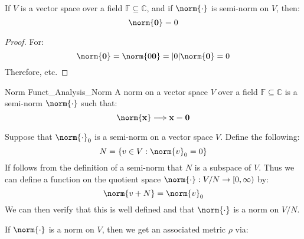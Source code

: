 \documentclass[crop=false,class=book,oneside]{standalone}                      %
\begin{document}
            \begin{theorem}
                If $V$ is a vector space over a field
                $\mathbb{F}\subseteq\mathbb{C}$, and if
                $\norm{\cdot}$ is semi-norm on $V$, then:
                \begin{equation}
                    \norm{\mathbf{0}}=0
                \end{equation}
            \end{theorem}
            \begin{proof}
                For:
                \begin{equation}
                    \norm{\mathbf{0}}
                    =\norm{0\mathbf{0}}
                    =|0|\norm{\mathbf{0}}=0
                \end{equation}
                Therefore, etc.
            \end{proof}
            \begin{ldefinition}{Norm}
                  {Funct_Analysis_Norm}
                A norm on a vector space $V$ over a
                field $\mathbb{F}\subseteq\mathbb{C}$
                is a semi-norm $\norm{\cdot}$ such that:
                \begin{equation}
                    \norm{\mathbf{x}}\Longrightarrow\mathbf{x}
                    =\mathbf{0}
                \end{equation}
            \end{ldefinition}
            \begin{lexample}
                Suppose that $\norm{\cdot}_{0}$ is a semi-norm
                on a vector space $V$. Define the following:
                \begin{equation}
                    N=\{v\in{V}:\norm{v}_{0}=0\}
                \end{equation}
                If follows from the definition of a semi-norm that
                $N$ is a subspace of $V$. Thus we can define a
                function on the quotient space
                $\norm{\cdot}:V/N\rightarrow[0,\infty)$ by:
                \begin{equation}
                    \norm{v+N}=\norm{v}_{0}
                \end{equation}
                We can then verify that this is well defined and
                that $\norm{\cdot}$ is a norm on $V/N$.
            \end{lexample}
            If $\norm{\cdot}$ is a norm on $V$, then we get an
            associated metric $\rho$ via:
\end{document}
